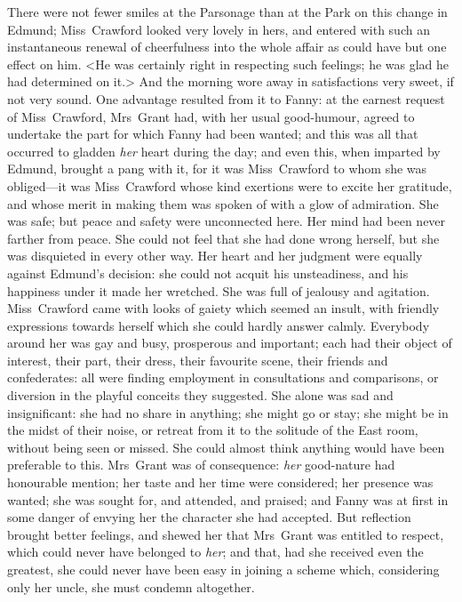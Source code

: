 There were not fewer smiles at the Parsonage than at the Park on this change in Edmund; Miss~Crawford looked very lovely in hers, and entered with such an instantaneous renewal of cheerfulness into the whole affair as could have but one effect on him. <He was certainly right in respecting such feelings; he was glad he had determined on it.> And the morning wore away in satisfactions very sweet, if not very sound. One advantage resulted from it to Fanny: at the earnest request of Miss~Crawford, Mrs~Grant had, with her usual good-humour, agreed to undertake the part for which Fanny had been wanted; and this was all that occurred to gladden \textit{her}  heart during the day; and even this, when imparted by Edmund, brought a pang with it, for it was Miss~Crawford to whom she was obliged—it was Miss~Crawford whose kind exertions were to excite her gratitude, and whose merit in making them was spoken of with a glow of admiration. She was safe; but peace and safety were unconnected here. Her mind had been never farther from peace. She could not feel that she had done wrong herself, but she was disquieted in every other way. Her heart and her judgment were equally against Edmund's decision: she could not acquit his unsteadiness, and his happiness under it made her wretched. She was full of jealousy and agitation. Miss~Crawford came with looks of gaiety which seemed an insult, with friendly expressions towards herself which she could hardly answer calmly. Everybody around her was gay and busy, prosperous and important; each had their object of interest, their part, their dress, their favourite scene, their friends and confederates: all were finding employment in consultations and comparisons, or diversion in the playful conceits they suggested. She alone was sad and insignificant: she had no share in anything; she might go or stay; she might be in the midst of their noise, or retreat from it to the solitude of the East room, without being seen or missed. She could almost think anything would have been preferable to this. Mrs~Grant was of consequence: \textit{her}  good-nature had honourable mention; her taste and her time were considered; her presence was wanted; she was sought for, and attended, and praised; and Fanny was at first in some danger of envying her the character she had accepted. But reflection brought better feelings, and shewed her that Mrs~Grant was entitled to respect, which could never have belonged to \textit{her}; and that, had she received even the greatest, she could never have been easy in joining a scheme which, considering only her uncle, she must condemn altogether.

